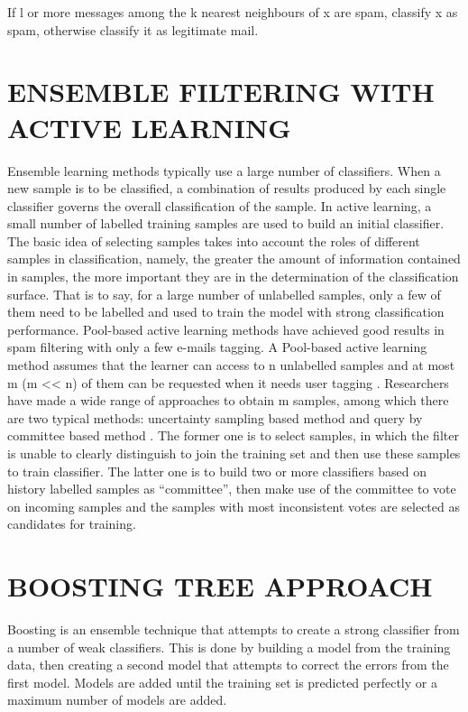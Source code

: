 If l or more messages among the k nearest neighbours of x are spam, classify x as spam, otherwise classify it as legitimate mail.

\section{ENSEMBLE FILTERING WITH ACTIVE LEARNING}
Ensemble learning methods typically use a large number of classifiers. When a new sample is to be classified, a combination of results produced by each single classifier governs the overall classification of the sample.
In active learning, a small number of labelled training samples are used to build an initial classifier. The basic idea of selecting samples takes into account the roles of different samples in classification, namely, the greater the amount of information contained in samples, the more important they are in the determination of the classification surface. That is to say, for a large number of unlabelled samples, only a few of them need to be labelled and used to train the model with strong classification performance.
Pool-based active learning methods have achieved good results in spam filtering with only a few e-mails tagging. A Pool-based active learning method assumes that the learner can access to n unlabelled samples and at most m (m << n) of them can be requested when it needs user tagging \citep{4}. Researchers have made a wide range of approaches to obtain m samples, among which there are two typical methods: uncertainty sampling based method and query by committee based method \citep{5}. The former one is to select samples, in which the filter is unable to clearly distinguish to join the training set and then use these samples to train classifier. The latter one is to build two or more classifiers based on history labelled samples as “committee”, then make use of the committee to vote on incoming samples and the samples with most inconsistent votes are selected as candidates for training.

\section{BOOSTING TREE APPROACH}
Boosting is an ensemble technique that attempts to create a strong classifier from a number of weak classifiers. This is done by building a model from the training data, then creating a second model that attempts to correct the errors from the first model. Models are added until the training set is predicted perfectly or a maximum number of models are added.\citep{6}

